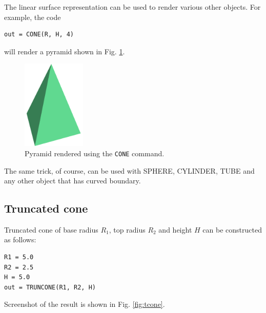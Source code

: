 \noindent
The linear surface representation can be used 
to render various other objects. For example, the code \\

\begin{bbox}
\begin{verbatim}
out = CONE(R, H, 4)
\end{verbatim}
\end{bbox}
\vspace{6mm}

\noindent
will render a pyramid shown in Fig. \ref{fig:cone-4}.

\begin{figure}[!ht]
\begin{center}
\includegraphics[width=0.27\textwidth]{img/cone-4.png}
\end{center}
\vspace{-4mm}
\caption{Pyramid rendered using the {\tt CONE} command.}
\label{fig:cone-4}
\vspace{-1cm}
\end{figure}
\newpage
\noindent
The same trick, of course, can be used with SPHERE, CYLINDER, TUBE and any 
other object that has curved boundary.

\subsection{Truncated cone}

Truncated cone of base radius $R_1$, top radius $R_2$ and height $H$
can be constructed as follows:\\

\begin{bbox}
\begin{verbatim}
R1 = 5.0
R2 = 2.5
H = 5.0
out = TRUNCONE(R1, R2, H)
\end{verbatim}
\end{bbox}
\vspace{6mm}

\noindent
Screenshot of the result is shown in Fig. \ref{fig:tcone}.

